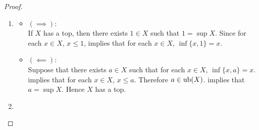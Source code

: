 \documentclass{book}
\begin{document}
	\begin{proof}\
		\begin{enumerate}
			\item 
			\begin{itemize}
				\item $(\implies)$: \\
				If $X$ has a top, then there exists $1 \in X$ such that $1 = \sup X$. Since for each $x \in X$, $x \leq 1$,  implies that for each $x \in X$, $\inf \{x, 1\} = x$.
				\item $(\impliedby)$: \\
				Suppose that there exists $a \in X$ such that for each $x \in X$, $\inf \{x, a\} = x$.  implies that for each $x \in X$, $x \leq a$. Therefore $a \in \operatorname{ub}(X)$.  implies that $a = \sup X$. Hence $X$ has a top.
			\end{itemize}
			\item {}
		\end{enumerate}
	\end{proof}
	
	
	
	
	
	
	
	
	
	
	
	
	
	
	
	
	
	
	
	
	
	
	
	
	
	
	
	
	
	
	
	
	
	
	
	
	
	
	
	
	
	
	
	
	
	
	
	
	
	
	
	
	
	
	
	
	
	
	
	
	
	
	
\end{document}
